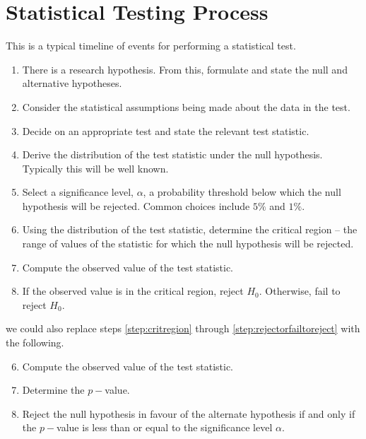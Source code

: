 \documentclass[1pt]{report}
\newcommand{\<}{\langle}
\renewcommand{\>}{\rangle}
\begin{document}
\section{Statistical Testing Process}
This is a typical timeline of events for performing a statistical test.
\begin{enumerate}
\item There is a research hypothesis. From this, formulate and state the null and alternative hypotheses.
\item Consider the statistical assumptions being made about the data in the test.
\item Decide on an appropriate test and state the relevant test statistic.
\item Derive the distribution of the test statistic under the null hypothesis. Typically this will be well known.
\item Select a significance level, $\alpha$, a probability threshold below which the null hypothesis will be rejected. Common choices include $5\%$ and $1\%$.
\item\label{step:critregion} Using the distribution of the test statistic, determine the critical region -- the range of values of the statistic for which the null hypothesis will be rejected.
\item Compute the observed value of the test statistic. 
\item \label{step:rejectorfailtoreject}If the observed value is in the critical region, reject $H_0$. Otherwise, fail to reject $H_0$.
\end{enumerate}
we could also replace steps \ref{step:critregion} through \ref{step:rejectorfailtoreject} with the following.
\begin{enumerate}
\setcounter{enumi}{5}
\item Compute the observed value of the test statistic.
\item Determine the $p-$value.
\item Reject the null hypothesis in favour of the alternate hypothesis if and only if the $p-$value is less than or equal to the significance level $\alpha$.
\end{enumerate}
\end{document}
